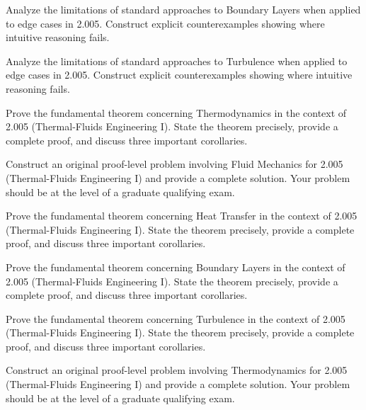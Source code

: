 \documentclass[12pt,a4paper]{exam}
\begin{document}
\begin{questions}
\vspace{0.3cm}

\question[5]
Analyze the limitations of standard approaches to Boundary Layers when applied to edge cases in 2.005. Construct explicit counterexamples showing where intuitive reasoning fails.

\vspace{0.3cm}

\question[4]
Analyze the limitations of standard approaches to Turbulence when applied to edge cases in 2.005. Construct explicit counterexamples showing where intuitive reasoning fails.

\vspace{0.3cm}

\question[4]
Prove the fundamental theorem concerning Thermodynamics in the context of 2.005 (Thermal-Fluids Engineering I). State the theorem precisely, provide a complete proof, and discuss three important corollaries.

\vspace{0.3cm}

\question[6]
Construct an original proof-level problem involving Fluid Mechanics for 2.005 (Thermal-Fluids Engineering I) and provide a complete solution. Your problem should be at the level of a graduate qualifying exam.

\vspace{0.3cm}

\question[4]
Prove the fundamental theorem concerning Heat Transfer in the context of 2.005 (Thermal-Fluids Engineering I). State the theorem precisely, provide a complete proof, and discuss three important corollaries.

\vspace{0.3cm}

\question[4]
Prove the fundamental theorem concerning Boundary Layers in the context of 2.005 (Thermal-Fluids Engineering I). State the theorem precisely, provide a complete proof, and discuss three important corollaries.

\vspace{0.3cm}

\question[4]
Prove the fundamental theorem concerning Turbulence in the context of 2.005 (Thermal-Fluids Engineering I). State the theorem precisely, provide a complete proof, and discuss three important corollaries.

\vspace{0.3cm}

\question[4]
Construct an original proof-level problem involving Thermodynamics for 2.005 (Thermal-Fluids Engineering I) and provide a complete solution. Your problem should be at the level of a graduate qualifying exam.


\end{questions}
\end{document}

